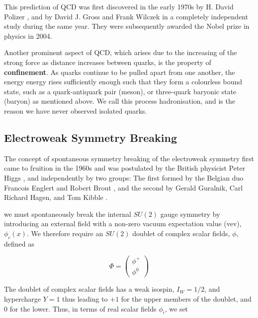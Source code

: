 This prediction of QCD was first discovered in the early 1970s by H. David Polizer \cite{PhysRevLett.30.1346}, and by David J. Gross and Frank Wilczek \cite{PhysRevD.8.3633} in a completely independent study during the same year. They were subsequently awarded the Nobel prize in physics in 2004.

Another prominent aspect of QCD, which arises due to the increasing of the strong force as distance increases between quarks, is the property of \textbf{confinement}. As quarks continue to be pulled apart from one another, the energy energy rises sufficiently enough such that they form a colourless bound state, such as a quark-antiquark pair (meson), or three-quark baryonic state (baryon) as mentioned above. We call this process hadronisation, and is the reason we have never observed isolated quarks.  


\subsection{Electroweak Symmetry Breaking} \label{subsec-ElectroweakSymmetryBreaking}

The concept of spontaneous symmetry breaking of the electroweak symmetry first came to fruition in the 1960s and was postulated by the British physicist Peter Higgs \cite{PhysRevLett.13.508}, and independently by two groups: The first formed by the Belgian duo Francois Englert and Robert Brout \cite{PhysRevLett.13.321}, and the second by Gerald Guralnik, Carl Richard Hagen, and Tom Kibble \cite{PhysRevLett.13.585}.

we must spontaneously break the internal $SU(2)$ gauge symmetry by introducing an external field with a non-zero vacuum expectation value (vev), $\phi_c(x)$. We therefore require an $SU(2)$ doublet of complex scalar fields, $\phi$, defined as

\begin{equation}
\Phi
= 
\begin{pmatrix}
\phi^+ \\
\phi^0
\end{pmatrix}
\end{equation}

The doublet of complex scalar fields has a weak isospin, $I_W = 1/2$, and hypercharge $Y = 1$ thus leading to $+1$ for the upper members of the doublet, and 0 for the lower. Thus, in terms of real scalar fields $\phi_i$, we set

